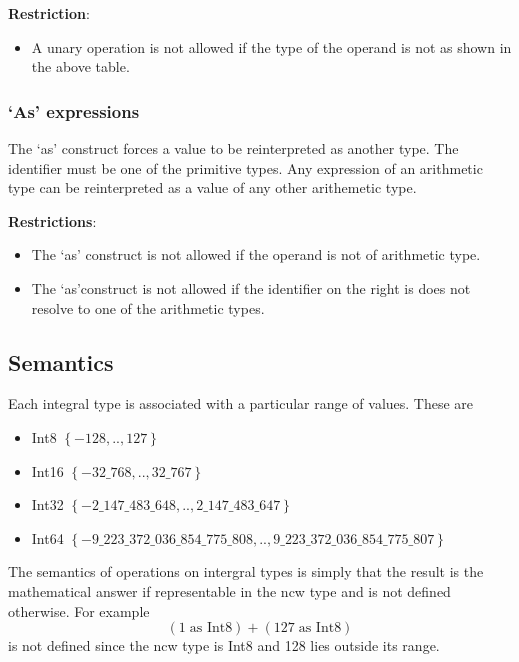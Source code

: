 \documentclass{article}%
\begin{document}
\textbf{Restriction}:

\begin{itemize}
\item A unary operation is not allowed if the type of the operand is not as
shown in the above table.
\end{itemize}

\subsubsection{`As' expressions}

The `as' construct forces a value to be reinterpreted as another type. The
identifier must be one of the primitive types. Any expression of an arithmetic
type can be reinterpreted as a value of any other arithemetic type.

\textbf{Restrictions}:

\begin{itemize}
\item The `as' construct is not allowed if the operand is not of arithmetic type.

\item The `as'construct is not allowed if the identifier on the right is does
not resolve to one of the arithmetic types.
\end{itemize}

\subsection{Semantics}

Each integral type is associated with a particular range of values. These are

\begin{itemize}
\item Int8 $\left\{  -128,..,127\right\}  $

\item Int16 $\left\{  -32\_768,..,32\_767\right\}  $

\item Int32 $\left\{  -2\_147\_483\_648,..,2\_147\_483\_647\right\}  $

\item Int64 $\left\{
-9\_223\_372\_036\_854\_775\_808,..,9\_223\_372\_036\_854\_775\_807\right\}  $
\end{itemize}

The semantics of operations on intergral types is simply that the result is
the mathematical answer if representable in the ncw type and is not defined
otherwise. For example%
\[
\left(  1\;\text{as Int8}\right)  +\left(  127\;\text{as Int8}\right)
\]
is not defined since the ncw type is Int8 and 128 lies outside its range.
\end{document}
